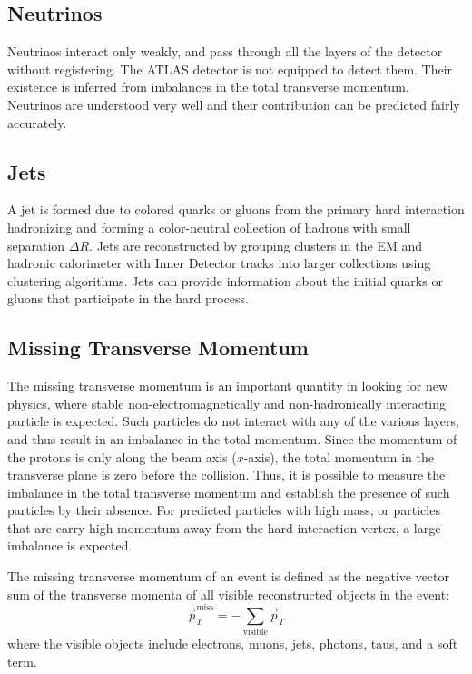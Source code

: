 \documentclass[11pt,a4paper,openright,twoside]{report}
\begin{document}
\subsection{Neutrinos}
Neutrinos interact only weakly, and pass through all the layers of the detector without registering. The ATLAS detector is not equipped to detect them. Their existence is inferred from imbalances in the total transverse momentum. Neutrinos are understood very well and their contribution can be predicted fairly accurately.

\subsection{Jets}
A jet is formed due to colored quarks or gluons from the primary hard interaction hadronizing and forming a color-neutral collection of hadrons with small separation $\Delta R$. Jets are reconstructed by grouping clusters in the EM and hadronic calorimeter  with Inner Detector tracks into larger collections using clustering algorithms. Jets can provide information about the initial quarks or gluons that participate in the hard process.

\subsection{Missing Transverse Momentum}
The missing transverse momentum is an important quantity in looking for new physics, where stable non-electromagnetically and non-hadronically interacting particle is expected. Such particles do not interact with any of the various layers, and thus result in an imbalance in the total momentum. Since the momentum of the protons is only along the beam axis ($x$-axis), the total momentum in the transverse plane is zero before the collision. Thus, it is possible to measure the imbalance in the total transverse momentum and establish the presence of such particles by their absence. For predicted particles with high mass, or particles that are carry high momentum away from the hard interaction vertex, a large imbalance is expected.

The missing transverse momentum of an event is defined as the negative vector sum of the transverse momenta of all visible reconstructed objects in the event:
\begin{equation}
\vec{p}_T^{\mathrm{miss}} = -\sum_{\mathrm{visible}}\vec{p}_T
\end{equation}
where the visible objects include electrons, muons, jets, photons, taus, and a soft term.
\end{document}
